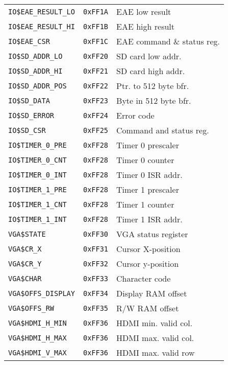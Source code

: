 \documentclass{leaflet}
\begin{document}
{\begin{center}
\begin{longtable}{|l|l|l|}
     \texttt{IO\$EAE\_RESULT\_LO}&\texttt{0xFF1A}&EAE low result\\
     \texttt{IO\$EAE\_RESULT\_HI}&\texttt{0xFF1B}&EAE high result\\
     \texttt{IO\$EAE\_CSR}&\texttt{0xFF1C}&EAE command \& status reg.\\
     \hline
     \texttt{IO\$SD\_ADDR\_LO}&\texttt{0xFF20}&SD card low addr.\\
     \texttt{IO\$SD\_ADDR\_HI}&\texttt{0xFF21}&SD card high addr.\\
     \texttt{IO\$SD\_ADDR\_POS}&\texttt{0xFF22}&Ptr. to 512 byte bfr.\\
     \texttt{IO\$SD\_DATA}&\texttt{0xFF23}&Byte in 512 byte bfr.\\
     \texttt{IO\$SD\_ERROR}&\texttt{0xFF24}&Error code\\
     \texttt{IO\$SD\_CSR}&\texttt{0xFF25}&Command and status reg.\\
     \hline
     \texttt{IO\$TIMER\_0\_PRE}&\texttt{0xFF28}&Timer 0 prescaler\\
     \texttt{IO\$TIMER\_0\_CNT}&\texttt{0xFF28}&Timer 0 counter\\
     \texttt{IO\$TIMER\_0\_INT}&\texttt{0xFF28}&Timer 0 ISR addr.\\
     \texttt{IO\$TIMER\_1\_PRE}&\texttt{0xFF28}&Timer 1 prescaler\\
     \texttt{IO\$TIMER\_1\_CNT}&\texttt{0xFF28}&Timer 1 counter\\
     \texttt{IO\$TIMER\_1\_INT}&\texttt{0xFF28}&Timer 1 ISR addr.\\
     \hline
     \texttt{VGA\$STATE}&\texttt{0xFF30}&VGA status register\\
     \texttt{VGA\$CR\_X}&\texttt{0xFF31}&Cursor X-position\\
     \texttt{VGA\$CR\_Y}&\texttt{0xFF32}&Cursor y-position\\
     \texttt{VGA\$CHAR}&\texttt{0xFF33}&Character code\\
     \texttt{VGA\$OFFS\_DISPLAY}&\texttt{0xFF34}&Display RAM offset\\
     \texttt{VGA\$OFFS\_RW}&\texttt{0xFF35}&R/W RAM offset\\
     \texttt{VGA\$HDMI\_H\_MIN}&\texttt{0xFF36}&HDMI min. valid col.\\
     \texttt{VGA\$HDMI\_H\_MAX}&\texttt{0xFF36}&HDMI max. valid col.\\
     \texttt{VGA\$HDMI\_V\_MAX}&\texttt{0xFF36}&HDMI max. valid row\\
     \hline
    \end{longtable}
   \end{center}
  }
%
\end{document}
